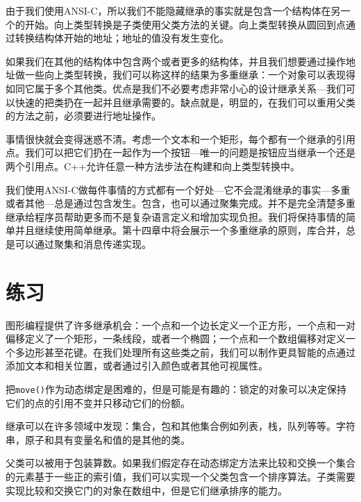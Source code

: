 由于我们使用ANSI-C，所以我们不能隐藏继承的事实就是包含一个结构体在另一个的开始。向上类型转换是子类使用父类方法的关键。向上类型转换从圆回到点通过转换结构体开始的地址；地址的值没有发生变化。

如果我们在其他的结构体中包含两个或者更多的结构体，并且我们想要通过操作地址做一些向上类型转换，我们可以称这样的结果为多重继承：一个对象可以表现得如同它属于多个其他类。优点是我们不必要考虑非常小心的设计继承关系---我们可以快速的把类扔在一起并且继承需要的。缺点就是，明显的，在我们可以重用父类的方法之前，必须要进行地址操作。

事情很快就会变得迷惑不清。考虑一个文本和一个矩形，每个都有一个继承的引用点。我们可以把它们扔在一起作为一个按钮---唯一的问题是按钮应当继承一个还是两个引用点。C++允许任意一种方法步法在构建和向上类型转换中。

我们使用ANSI-C做每件事情的方式都有一个好处---它不会混淆继承的事实---多重或者其他---总是通过包含发生。包含，也可以通过聚集完成。并不是完全清楚多重继承给程序员帮助更多而不是复杂语言定义和增加实现负担。我们将保持事情的简单并且继续使用简单继承。第十四章中将会展示一个多重继承的原则，库合并，总是可以通过聚集和消息传递实现。

\section{练习}

图形编程提供了许多继承机会：一个点和一个边长定义一个正方形，一个点和一对偏移定义了一个矩形，一条线段，或者一个椭圆；一个点和一个数组偏移对定义一个多边形甚至花键。在我们处理所有这些类之前，我们可以制作更具智能的点通过添加文本和相关位置，或者通过引入颜色或者其他可视属性。

把\verb|move()|作为动态绑定是困难的，但是可能是有趣的：锁定的对象可以决定保持它们的点的引用不变并只移动它们的份额。

继承可以在许多领域中发现：集合，包和其他集合例如列表，栈，队列等等。字符串，原子和具有变量名和值的是其他的类。

父类可以被用于包装算数。如果我们假定存在动态绑定方法来比较和交换一个集合的元素基于一些正的索引值，我们可以实现一个父类包含一个排序算法。子类需要实现比较和交换它门的对象在数组中，但是它们继承排序的能力。


